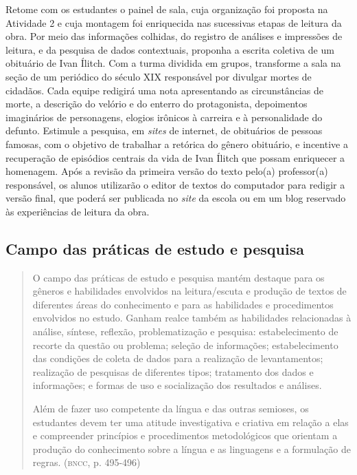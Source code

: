 \documentclass[12pt]{extarticle}
\begin{document}
Retome com os estudantes o painel de sala, cuja organização foi
proposta na Atividade 2 e cuja montagem foi enriquecida nas sucessivas
etapas de leitura da obra. Por meio das informações colhidas, do
registro de análises e impressões de leitura, e da pesquisa de dados
contextuais, proponha a escrita coletiva de um obituário de
Ivan Ílitch. Com a turma dividida em grupos, transforme a sala na
seção de um periódico do século XIX responsável por divulgar mortes de
cidadãos. Cada equipe redigirá uma nota apresentando as circunstâncias
de morte, a descrição do velório e do enterro do protagonista,
depoimentos imaginários de personagens, elogios irônicos à carreira e
à personalidade do defunto. Estimule a pesquisa, em \emph{sites} de
internet, de obituários de pessoas famosas, com o objetivo de
trabalhar a retórica do gênero obituário, e incentive a
recuperação de episódios centrais da vida de Ivan Ílitch que possam
enriquecer a homenagem. Após a revisão da primeira versão do texto
pelo(a) professor(a) responsável, os alunos utilizarão o editor de
textos do computador para redigir a versão final, que poderá ser
publicada no \emph{site} da escola ou em um blog reservado às
experiências de leitura da obra.

\subsection{Campo das práticas de estudo e pesquisa}

\begin{quote}
O campo das práticas de estudo e pesquisa mantém destaque para os
gêneros e habilidades envolvidos na leitura/escuta e produção de textos
de diferentes áreas do conhecimento e para as habilidades e
procedimentos envolvidos no estudo. Ganham realce também as habilidades
relacionadas à análise, síntese, reflexão, problematização e pesquisa:
estabelecimento de recorte da questão ou problema; seleção de
informações; estabelecimento das condições de coleta de dados para a
realização de levantamentos; realização de pesquisas de diferentes
tipos; tratamento dos dados e informações; e formas de uso e
socialização dos resultados e análises.

Além de fazer uso competente da língua e das outras semioses, os
estudantes devem ter uma atitude investigativa e criativa em relação a
elas e compreender princípios e procedimentos metodológicos que orientam
a produção do conhecimento sobre a língua e as linguagens e a formulação
de regras. (\textsc{bncc}, p. 495-496)
\end{quote}
\end{document}
